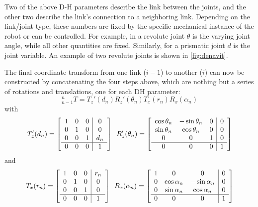 Two of the above D-H parameters describe the link between the joints, and the other two describe the link's connection to a neighboring link.
Depending on the link/joint type, these numbers are fixed by the specific mechanical instance of the robot or can be controlled.
For example, in a revolute joint $ \theta$ is the varying joint angle, while all other quantities are fixed.  Similarly, for a prismatic joint $d$ is the joint variable. An example of two revolute joints is shown in \cref{fig:denavit}.

The final coordinate transform from one link ($i-1$) to another ($i$) can now be constructed by concatenating the four steps above, which are nothing but a series of rotations and translations, one for each DH parameter:
%
\begin{equation}\label{eq:kinematics:dh:composition}
_{n-1}^nT=T_z'(d_n) R_z'(\theta_n) T_x(r_n)  R_x(\alpha_n)
\end{equation}
with
\begin{equation}
T_z'(d_n)=
\left[
\begin{array}{ccc|c}
1 & 0 & 0 & 0\\
0 & 1 & 0 & 0\\
0 & 0 & 1 & d_n\\
\hline
0 & 0 & 0 & 1
\end{array}
\right]
\enskip
R_z'(\theta_n)=\left[
\begin{array}{ccc|c}
\cos\theta_n & -\sin\theta_n & 0 & 0\\
\sin\theta_n & \cos\theta_n & 0 & 0\\
0 & 0 & 1 & 0\\
\hline
0 & 0 & 0 & 1
\end{array}
\right]
\end{equation}
and
\begin{equation}
T_x(r_n)=
\left[
\begin{array}{ccc|c}
1 & 0 & 0 & r_n\\
0 & 1 & 0 & 0\\
0 & 0 & 1 & 0\\
\hline
0 & 0 & 0 & 1
\end{array}
\right]
\enskip
R_x(\alpha_n)=\left[
\begin{array}{ccc|c}
1 & 0 & 0 & 0\\
0 & \cos\alpha_n & -\sin\alpha_n & 0\\
0 & \sin\alpha_n & \cos\alpha_n & 0\\
\hline
0 & 0 & 0 & 1
\end{array}
\right]
\end{equation}
